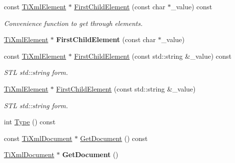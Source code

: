 \begin{DoxyCompactItemize}
\item 
\hypertarget{class_ti_xml_node_accda2c6b45c25bb5a6f9c3407a644e61}{
const \hyperlink{class_ti_xml_element}{TiXmlElement} $\ast$ \hyperlink{class_ti_xml_node_accda2c6b45c25bb5a6f9c3407a644e61}{FirstChildElement} (const char $\ast$\_\-value) const }
\label{class_ti_xml_node_accda2c6b45c25bb5a6f9c3407a644e61}

\begin{DoxyCompactList}\small\item\em Convenience function to get through elements. \item\end{DoxyCompactList}\item 
\hypertarget{class_ti_xml_node_a6936ae323675071808ac4840379e57f5}{
\hyperlink{class_ti_xml_element}{TiXmlElement} $\ast$ {\bfseries FirstChildElement} (const char $\ast$\_\-value)}
\label{class_ti_xml_node_a6936ae323675071808ac4840379e57f5}

\item 
\hypertarget{class_ti_xml_node_a327ad4bbd90073c5dfc931b07314f5f7}{
const \hyperlink{class_ti_xml_element}{TiXmlElement} $\ast$ \hyperlink{class_ti_xml_node_a327ad4bbd90073c5dfc931b07314f5f7}{FirstChildElement} (const std::string \&\_\-value) const }
\label{class_ti_xml_node_a327ad4bbd90073c5dfc931b07314f5f7}

\begin{DoxyCompactList}\small\item\em STL std::string form. \item\end{DoxyCompactList}\item 
\hypertarget{class_ti_xml_node_a7f1d7291880534c1e5cdeb392d8c1f45}{
\hyperlink{class_ti_xml_element}{TiXmlElement} $\ast$ \hyperlink{class_ti_xml_node_a7f1d7291880534c1e5cdeb392d8c1f45}{FirstChildElement} (const std::string \&\_\-value)}
\label{class_ti_xml_node_a7f1d7291880534c1e5cdeb392d8c1f45}

\begin{DoxyCompactList}\small\item\em STL std::string form. \item\end{DoxyCompactList}\item 
int \hyperlink{class_ti_xml_node_a57b99d5c97d67a42b9752f5210a1ba5e}{Type} () const 
\item 
const \hyperlink{class_ti_xml_document}{TiXmlDocument} $\ast$ \hyperlink{class_ti_xml_node_a80e397fa973cf5323e33b07154b024f3}{GetDocument} () const 
\item 
\hypertarget{class_ti_xml_node_a7b2372c0e7adfb32f5b6902fe49a39b2}{
\hyperlink{class_ti_xml_document}{TiXmlDocument} $\ast$ {\bfseries GetDocument} ()}
\label{class_ti_xml_node_a7b2372c0e7adfb32f5b6902fe49a39b2}


\end{DoxyCompactItemize}
